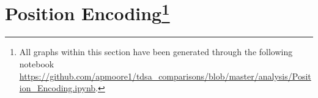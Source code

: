 \section[Position Encoding]{Position Encoding\footnote{All graphs within this section have been generated through the following notebook \url{https://github.com/apmoore1/tdsa_comparisons/blob/master/analysis/Position_Encoding.ipynb}.}}
\label{section:aug_position_encoding}
